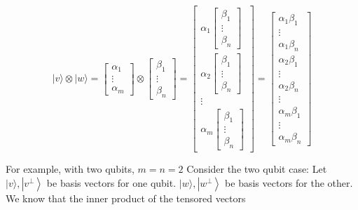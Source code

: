\documentclass[main.tex]{subfiles}
\begin{document}
    $$
    |v\rangle \otimes|w\rangle=\left[\begin{array}{r}
    \alpha_{1} \\
    \vdots \\
    \alpha_{m}
    \end{array}\right] \otimes\left[\begin{array}{r}
    \beta_{1} \\
    \vdots \\
    \beta_{n}
    \end{array}\right]
    =\left[\begin{array}{c}
    \alpha_{1}\left[\begin{array}{c}
    \beta_{1} \\
    \vdots \\
    \beta_{n}
    \end{array}\right] \\
    \alpha_{2}\left[\begin{array}{c}
    \beta_{1} \\
    \vdots \\
    \beta_{n}
    \end{array}\right] \\
    \vdots \\
    \alpha_{m}\left[\begin{array}{c}
    \beta_{1} \\
    \vdots \\
    \beta_{n}
    \end{array}\right]
    \end{array}\right]=\left[\begin{array}{c}
    \alpha_{1} \beta_{1} \\
    \vdots \\
    \alpha_{1} \beta_{n} \\
    \alpha_{2} \beta_{1} \\
    \vdots \\
    \alpha_{2} \beta_{n} \\
    \vdots \\
    \alpha_{m} \beta_{1} \\
    \vdots \\
    \alpha_{m} \beta_{n}
    \end{array}\right]
    $$
    
    For example, with two qubits, $m=n=2$ Consider the two qubit case: Let $|v\rangle,\left|v^{\perp}\right\rangle$ be basis vectors for one qubit. $|w\rangle,\left|w^{\perp}\right\rangle$ be basis vectors for the other. We know that the inner product of the tensored vectors
    
\end{document}
